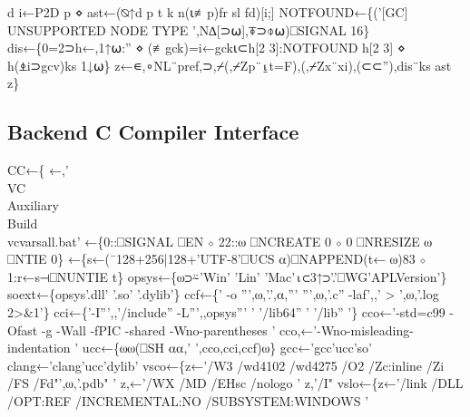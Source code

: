 \documentclass{article}%
\begin{document}
        d i←P2D p ⋄ ast←(⍉↑d p t k n(⍳≢p)fr sl fd)[i;]
        NOTFOUND←\{('[GC] UNSUPPORTED NODE TYPE ',N∆[⊃⍵],⍕⊃⌽⍵)⎕SIGNAL 16\}
        dis←\{0=2⊃h←,1↑⍵:'' ⋄ (≢gck)=i←gck⍳⊂h[2 3]:NOTFOUND h[2 3] ⋄ h(⍎i⊃gcv)ks 1↓⍵\}
        z←∊,∘NL¨pref,⊃,⌿(,⌿Zp¨⍸t=F),(,⌿Zx¨xi),(⊂⊂''),dis¨ks ast
        z\}
\nwendcode{}\nwdocspar

\subsection{Backend C Compiler Interface}

\nwenddocs{}\endmoddef\nwstartdeflinemarkup{}\nwenddeflinemarkup
CC←\{
        ←,'\\VC\\Auxiliary\\Build\\vcvarsall.bat'
        ←\{0::⎕SIGNAL ⎕EN ⋄ 22::⍵ ⎕NCREATE 0 ⋄ 0 ⎕NRESIZE ⍵ ⎕NTIE 0\}
        ←\{s←(¯128+256|128+'UTF-8'⎕UCS ⍺)⎕NAPPEND(t← ⍵)83 ⋄ 1:r←s⊣⎕NUNTIE t\}
        opsys←\{⍵⊃⍨'Win' 'Lin' 'Mac'⍳⊂3↑⊃'.'⎕WG'APLVersion'\}
        soext←\{opsys'.dll' '.so' '.dylib'\}
        ccf←\{' -o ''',⍵,'.',⍺,''' ''',⍵,'.c'' -laf',,' > ',⍵,'.log 2>&1'\}
        cci←\{'-I''',,'/include'' -L''',,opsys''' ' '/lib64'' ' '/lib'' '\}
        cco←'-std=c99 -Ofast -g -Wall -fPIC -shared -Wno-parentheses '
        cco,←'-Wno-misleading-indentation '
        ucc←\{⍵⍵(⎕SH ⍺⍺,' ',cco,cci,ccf)⍵\}
        gcc←'gcc'ucc'so'
        clang←'clang'ucc'dylib'
        vsco←\{z←'/W3 /wd4102 /wd4275 /O2 /Zc:inline /Zi /FS /Fd"',⍵,'.pdb" '
                z,←'/WX /MD /EHsc /nologo '
                z,'/I"%
        vslo←\{z←'/link /DLL /OPT:REF /INCREMENTAL:NO /SUBSYSTEM:WINDOWS '
\end{document}
